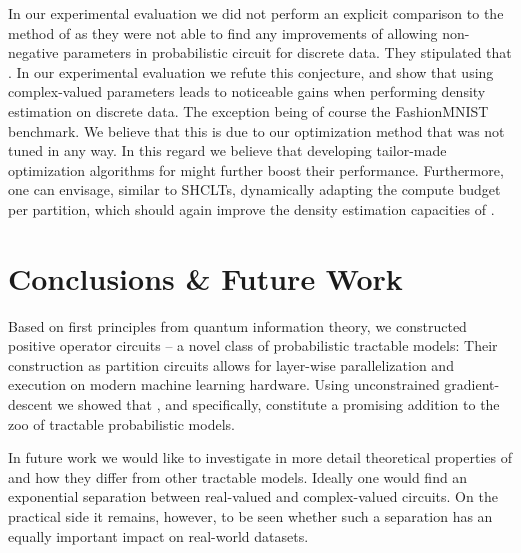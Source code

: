 In our experimental evaluation we did not perform an explicit comparison to the method of \citet{loconte2024subtractive} as they were not able to find any improvements of allowing non-negative parameters in probabilistic circuit for discrete data. They stipulated that
.
In our experimental evaluation we refute this conjecture, and show that using complex-valued parameters leads to noticeable gains when performing density estimation on discrete data.
The exception being of course the FashionMNIST benchmark. We believe that this is due to our optimization method that was not tuned in any way.
In this regard we believe that developing tailor-made optimization algorithms for \pvcs might further boost their performance.
Furthermore, one can envisage, similar to SHCLTs, dynamically adapting the compute budget per partition, which should again improve the density estimation capacities of \pvcs.






\section{Conclusions \& Future Work}
\label{sec:conclusions}

Based on first principles from quantum information theory, we constructed positive operator circuits -- a novel class of probabilistic tractable models:
Their construction as partition circuits allows for layer-wise parallelization and execution on modern machine learning hardware.
Using unconstrained gradient-descent we showed that \pocs, and \pvcs specifically, constitute a promising addition to the zoo of tractable probabilistic models.

In future work we would like to investigate in more detail theoretical properties of \pocs and how they differ from other tractable models. Ideally one would find an exponential separation between real-valued and complex-valued circuits. On the practical side it remains, however, to be seen whether such a separation has an equally important impact on real-world datasets.

